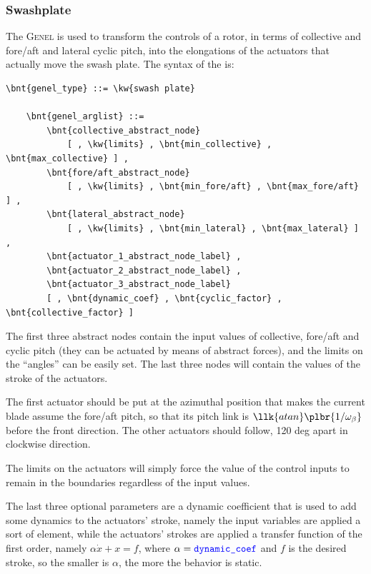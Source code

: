 \subsubsection{Swashplate}
\label{sec:EL:GENEL:SWASHPLATE}
The  \textsc{Genel} is used to transform the controls 
of a rotor, in terms of collective and fore/aft and lateral cyclic pitch, 
into the elongations of the actuators that actually move the swash plate.
The syntax of the  is:
\begin{Verbatim}[commandchars=\\\{\}]
    \bnt{genel_type} ::= \kw{swash plate}

    \bnt{genel_arglist} ::=
        \bnt{collective_abstract_node}
            [ , \kw{limits} , \bnt{min_collective} , \bnt{max_collective} ] ,
        \bnt{fore/aft_abstract_node}
            [ , \kw{limits} , \bnt{min_fore/aft} , \bnt{max_fore/aft} ] ,
        \bnt{lateral_abstract_node} 
            [ , \kw{limits} , \bnt{min_lateral} , \bnt{max_lateral} ] ,
        \bnt{actuator_1_abstract_node_label} ,
        \bnt{actuator_2_abstract_node_label} ,
        \bnt{actuator_3_abstract_node_label} 
        [ , \bnt{dynamic_coef} , \bnt{cyclic_factor} , \bnt{collective_factor} ]
\end{Verbatim}
The first three abstract nodes contain the input values 
of collective, fore/aft and cyclic pitch
(they can be actuated by means of abstract forces),
and the limits on the ``angles'' can be easily set. 
The last three nodes will contain the values of the stroke of the actuators.

The first actuator should be put at the azimuthal position 
that makes the current blade assume the fore/aft pitch,
so that its pitch link is $\llk{atan}\plbr{1/\omega_{\beta}}$
before the front direction.
The other actuators should follow, 120 deg apart in clockwise direction.

The limits on the actuators will simply force the value of the control
inputs to remain in the boundaries regardless of the input values.

The last three optional parameters are a dynamic coefficient that is used to
add some dynamics to the actuators' stroke, namely the input variables are
applied a sort of   element, while the
actuators' strokes are applied a transfer function of the first order, namely
$ \alpha\dot{x}+x=f $, where $ \alpha=\textcolor{blue}{\texttt{dynamic\_coef}} $ and $ f $ is
the desired stroke, so the smaller is $ \alpha $, the more the behavior is
static.


